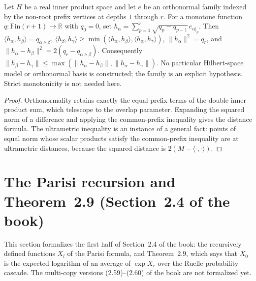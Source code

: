 \begin{theorem}\label{thm:sg:cascade-geometry}
  \leanok
Let $H$ be a real inner product space and let $e$ be an orthonormal family
indexed by the non-root prefix vertices at depths $1$ through $r$.
For a monotone function $q:\mathrm{Fin}(r+1)\to\mathbb R$ with $q_0=0$, set
$h_\alpha=\sum_{p=1}^r\sqrt{q_p-q_{p-1}}\,e_{\alpha|_p}$.
Then $\langle h_\alpha,h_\beta\rangle=q_{\alpha\wedge\beta}$,
$\langle h_\beta,h_\gamma\rangle\ge
\min(\langle h_\alpha,h_\beta\rangle,\langle h_\alpha,h_\gamma\rangle)$,
$\|h_\alpha\|^2=q_r$, and
$\|h_\alpha-h_\beta\|^2=2(q_r-q_{\alpha\wedge\beta})$.
Consequently
$\|h_\beta-h_\gamma\|\le
\max(\|h_\alpha-h_\beta\|,\|h_\alpha-h_\gamma\|)$.
No particular Hilbert-space model or orthonormal basis is constructed; the
family is an explicit hypothesis. Strict monotonicity is not needed here.
\end{theorem}
\begin{proof}
  \leanok
Orthonormality retains exactly the equal-prefix terms of the double inner
product sum, which telescope to the overlap parameter. Expanding the
squared norm of a difference and applying the common-prefix inequality
gives the distance formula. The ultrametric inequality is an instance of a
general fact: points of equal norm whose scalar products satisfy the
common-prefix inequality are at ultrametric distances, because the squared
distance is $2(M-\langle\cdot,\cdot\rangle)$.
\end{proof}


\section{The Parisi recursion and Theorem~2.9 (Section~2.4 of the book)}\label{sec:sg:parisi}

This section formalizes the first half of Section~2.4 of the book: the recursively defined
functions $X_l$ of the Parisi formula, and Theorem~2.9, which says that $X_0$ is the expected
logarithm of an average of $\exp X_r$ over the Ruelle probability cascade. The multi-copy
versions (2.59)--(2.60) of the book are not formalized yet.

